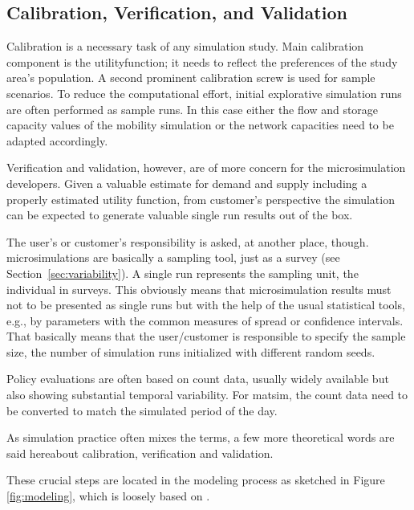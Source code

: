 \subsection{Calibration, Verification, and Validation}
Calibration is a necessary task of any simulation study. Main calibration component is the \gls{utilityfunction}; it needs to reflect the preferences of the study area's population. A second prominent calibration screw is used for sample \glspl{scenario}. To reduce the computational effort, initial explorative simulation runs are often performed as sample runs. In this case either the flow and storage capacity values of the mobility simulation or the network capacities need to be adapted accordingly.

Verification and validation, however, are of more concern for the \gls{microsimulation} developers. Given a valuable estimate for demand and supply including a properly estimated utility function, from customer's perspective the simulation can be expected to generate valuable single run results out of the box.

The user's or customer's responsibility is asked, at another place, though. \Glspl{microsimulation} are basically a sampling tool, just as a survey (see Section~\ref{sec:variability}). A single run represents the sampling unit, the individual in surveys. This obviously means that \gls{microsimulation} results must not to be presented as single runs but with the help of the usual statistical tools, e.g., by parameters with the common measures of spread or confidence intervals. That basically means that the user/customer is responsible to specify the sample size, the number of simulation runs initialized with different random seeds. 

Policy evaluations are often based on count data, usually widely available but also showing substantial temporal variability. For \gls{matsim}, the count data need to be converted to match the simulated period of the day.

As simulation practice often mixes the terms, a few more theoretical words are said hereabout calibration, verification and validation. 

These crucial steps are located in the modeling process as sketched in Figure \ref{fig:modeling}, which is loosely based on \citet[][Figure 10.2]{Petty_SokolowskiBanks_2010}. 

